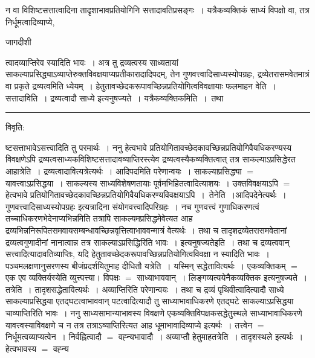 \documentclass[10pt, openany]{book}
\begin{document}
{\newpage
{\la न वा विशिष्टसत्तात्वादिना तादृशाभावप्रतियोगिनि सत्तादावतिप्रसङ्गः~। यत्रैकव्यक्तिकं साध्यं विपक्षो वा, तत्र निर्धूमत्वादिव्याप्ये,}
\begin{center} जागदीशी \end{center}
{\la त्वादव्याप्तिरेव स्यादिति भावः~। अत्र तु द्रव्यत्वस्य साध्यतायां साकल्याप्रसिद्ध्याऽव्याप्तेरुक्तविवक्षयाप्यप्रतीकारादादिपदम्, तेन गुणवत्त्वादिसाध्यस्योपग्रहः, द्रव्येतरासमवेतमात्रं वा प्रकृते द्रव्यत्वमिति ध्येयम्~। हेतुतावच्छेदकरूपावच्छिन्नप्रतियोगित्वविवक्षायाः फलमाह\textendash न वेति~। सत्तादाविति~। द्रव्यत्वादौ साध्ये इत्यनुषज्यते~। यत्रैकव्यक्तिकमिति~।~तथा}\\
\hrule
\begin{center}
विवृति:    
\end{center}
ष्टसत्ताभावेऽसत्त्वादिति तु परमार्थः~। ननु हेत्वभावे प्रतियोगितावच्छेदकावच्छिन्नप्रतियोगिवैयधिकरण्यस्य विवक्षणेऽपि द्रव्यत्वसाध्यकविशिष्टसत्तादावव्याप्तिरस्त्येव द्रव्यत्वस्यैकव्यक्तित्वात् तत्र साकल्याऽप्रसिद्धेरत आहात्रेति~। द्रव्यत्वादावित्यत्रेत्यर्थः~। आदिपदमिति परेणान्वयः~। साकल्याप्रसिद्ध्या $=$ यावत्त्वाऽप्रसिद्धया~। साकल्यस्य साध्यविशेषणतायाः पूर्वमभिहितत्वादित्याशयः~। उक्तविवक्षयाऽपि $=$ हेत्वभावे प्रतियोगितावच्छेदकावच्छिन्नप्रतियोगिवैयधिकरण्यविवक्षयाऽपि~।~{\la तेनेति~।}आदिपदेनेत्यर्थः~। गुणवत्त्वादिसाध्यस्योपग्रहः {\qt इत्यत्रादिना संयोगवत्त्वादिपरिग्रहः}~। नच गुणवत्त्वं  गुणाधिकरणत्वं तच्चाधिकरणभेदेनाप्यभिन्नमिति तत्रापि साकल्यमप्रसिद्धमेवेत्यत आह द्रव्यभिन्ननिरूपितसमवायसम्बन्धावच्छिन्नवृत्तित्वाभाववन्मात्रं वेत्यर्थः~। तथा च तादृशद्रव्येतरासमवेतानां द्रव्यत्वगुणादीनां नानात्वान्न तत्र साकल्याऽप्रसिद्धिरिति भावः~। इत्यनुषज्यते\textendash इति~। तथा च द्रव्यत्ववान् सत्त्वादित्यादावतिव्याप्तिः, यदि हेतुतावच्छेदकरूपावच्छिन्नप्रतियोगित्वविवक्षा न स्यादिति भावः~। पञ्चमलक्षणानुसरणस्य बीजंप्रदर्शयितुमाह दीधितौ यत्रेति~। यस्मिन् सद्धेतावित्यर्थः~।
एकव्यक्तिकम् $=$ एक एव व्यक्तिर्यस्येति व्युत्त्पत्त्या। विपक्षः $=$ साध्याभाववान्~।
लिङ्गव्यत्ययेनैकव्यक्तिक  इत्यनुषज्यते~। तत्रेति~। तादृशसद्धेतावित्यर्थः~। अव्याप्तिरिति परेणान्वयः~। तथा च द्रव्यं पृथिवीत्वादित्यादौ साध्ये साकल्याप्रसिद्धया
एतद्घटत्वाभाववान् पटत्वादित्यादौ तु साध्याभावाधिकरणे एतद्घटे साकल्याऽप्रसिद्धया चाव्याप्तिरिति भावः~। ननु साध्यसामान्याभावस्य विवक्षणे एकव्यक्तिविपक्षकसद्धेतुस्थले साध्याभावाधिकरणे यावत्त्वस्याविवक्षणे च न तत्र तत्राऽव्याप्तिरित्यत आह धूमाभावादिव्याप्ये इत्यर्थः~। तत्त्वेन $=$ निर्धूमत्वव्याप्यत्वेन~। निर्वह्नित्वादौ $=$ वह्न्यभावादौ~। अव्याप्तौ हेतुमाह\textendash तत्रेति~। तादृशस्थले इत्यर्थः~। हेत्वभावस्य $=$ वह्न्य
}
\end{document}
